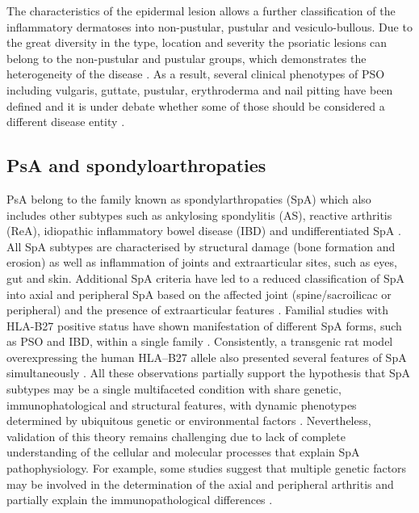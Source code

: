 The characteristics of the epidermal lesion allows a further classification of the inflammatory dermatoses into non-pustular, pustular and vesiculo-bullous. Due to the great diversity in the type, location and severity the psoriatic lesions can belong to the non-pustular and pustular groups, which demonstrates the heterogeneity of the disease \parencite{Perera2012}. As a result, several clinical phenotypes of PSO including vulgaris, guttate, pustular, erythroderma and nail pitting have been defined and it is under debate whether some of those should be considered a different disease entity \parencite{Marrakchi2011}.


\subsection{PsA and spondyloarthropaties}
%
PsA belong to the family known as spondylarthropaties (SpA) which also includes other subtypes such as ankylosing spondylitis (AS), reactive arthritis (ReA), idiopathic inflammatory
bowel disease (IBD) and undifferentiated SpA \parencite{}. All SpA subtypes are characterised by structural damage (bone formation and erosion) as well as inflammation of joints and extraarticular sites, such as eyes, gut and skin. Additional SpA criteria have led to a reduced classification of SpA into axial and peripheral SpA based on the affected joint (spine/sacroilicac or peripheral) and the presence of extraarticular features \parencite{Runwaleit2001, Runwaleit2001}. Familial studies with HLA-B27 positive status have shown manifestation of different SpA forms, such as PSO and IBD, within a single family \parencite{Said-Nahal2000}. Consistently, a transgenic rat model overexpressing the human HLA–B27 allele also presented several features of SpA simultaneously \parencite{Hammer1990}. All these observations partially support the hypothesis that SpA subtypes may be a single multifaceted condition with share genetic, immunophatological and structural features, with dynamic phenotypes determined by ubiquitous genetic or environmental factors \parencite{Baeten2013}. Nevertheless, validation of this theory remains challenging due to lack of complete understanding of the cellular and molecular processes that explain SpA pathophysiology. For example, some studies suggest that multiple genetic factors may be involved in the determination of the axial and peripheral arthritis \parencite{Porcher2005} and partially explain the immunopathological differences \parencite{Appel2011, Noordenbos2012}.


